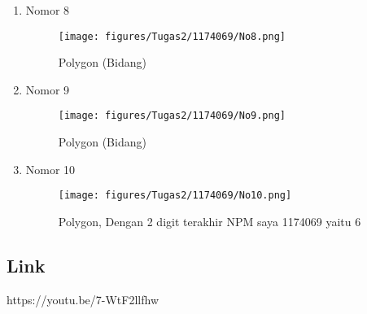 \begin{enumerate}
\begin{figure}[H]
	\end{figure}
	\item Nomor 8
	
	\begin{figure}[H]
		\texttt{[image: figures/Tugas2/1174069/No8.png]}
		\centering
		\caption{Polygon (Bidang)}
	\end{figure}
	\item Nomor 9
	
	\begin{figure}[H]
		\texttt{[image: figures/Tugas2/1174069/No9.png]}
		\centering
		\caption{Polygon (Bidang)}
	\end{figure}
	\item Nomor 10
	
	\begin{figure}[H]
		\texttt{[image: figures/Tugas2/1174069/No10.png]}
		\centering
		\caption{Polygon, Dengan 2 digit terakhir NPM saya 1174069 yaitu 6 }
	\end{figure}
\end{enumerate}
\subsection{Link}
https://youtu.be/7-WtF2llfhw